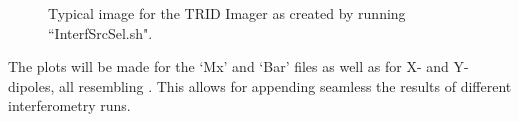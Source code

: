 {\begin{figure}[th]
	\caption{Typical image for the TRID Imager as created by running ``InterfSrcSel.sh".}	 
\end{figure}

The plots will be made for the `Mx' and `Bar' files as well as for X- and Y-dipoles, all resembling . This allows for appending seamless the results of different interferometry runs.

} %
